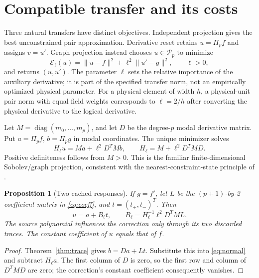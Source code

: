 \documentclass[11pt]{article}
\newtheorem{proposition}[theorem]{Proposition}
\newcommand{\PP}{\mathcal P}
\newcommand{\proj}{\Pi_p}
\newcommand{\norm}[1]{\lVert #1\rVert}
\begin{document}
\section{Compatible transfer and its costs}
Three natural transfers have distinct objectives. Independent projection gives the best unconstrained pair approximation. Derivative reset retains \(u=\proj f\) and assigns \(v=u'\). Graph projection instead chooses \(u\in\PP_p\) to minimize
\begin{equation}\label{eq:objective}
 \mathcal E_\ell(u)=\norm{u-f}^2+\ell^2\norm{u'-g}^2,\qquad \ell>0,
\end{equation}
and returns \((u,u')\). The parameter \(\ell\) sets the relative importance of the auxiliary derivative; it is part of the specified transfer norm, not an empirically optimized physical parameter. For a physical element of width \(h\), a physical-unit pair norm with equal field weights corresponds to \(\ell=2/h\) after converting the physical derivative to the logical derivative.

Let \(M=\operatorname{diag}(m_0,\ldots,m_p)\), and let \(D\) be the degree-\(p\) modal derivative matrix. Put \(a=\proj f\), \(b=\proj g\) in modal coordinates. The unique minimizer solves
\begin{equation}\label{eq:normal}
 H_\ell u=Ma+\ell^2D^TMb,\qquad H_\ell=M+\ell^2D^TMD.
\end{equation}
Positive definiteness follows from \(M>0\). This is the familiar finite-dimensional Sobolev/graph projection, consistent with the nearest-constraint-state principle of \cite{holst}.

\begin{proposition}[Two cached responses]\label{prop:response}
If \(g=f'\), let \(L\) be the \((p+1)\)-by-2 coefficient matrix in \eqref{eq:coeff}, and \(t=(t_+,t_-)^T\). Then
\begin{equation}\label{eq:response}
 u=a+B_\ell t,\qquad B_\ell=H_\ell^{-1}\ell^2D^TML.
\end{equation}
The source polynomial influences the correction only through its two discarded traces. The constant coefficient of \(u\) equals that of \(f\).
\end{proposition}
\begin{proof}
Theorem~\ref{thm:trace} gives \(b=Da+Lt\). Substitute this into \eqref{eq:normal} and subtract \(H_\ell a\). The first column of \(D\) is zero, so the first row and column of \(D^TMD\) are zero; the correction's constant coefficient consequently vanishes.
\end{proof}
\end{document}
